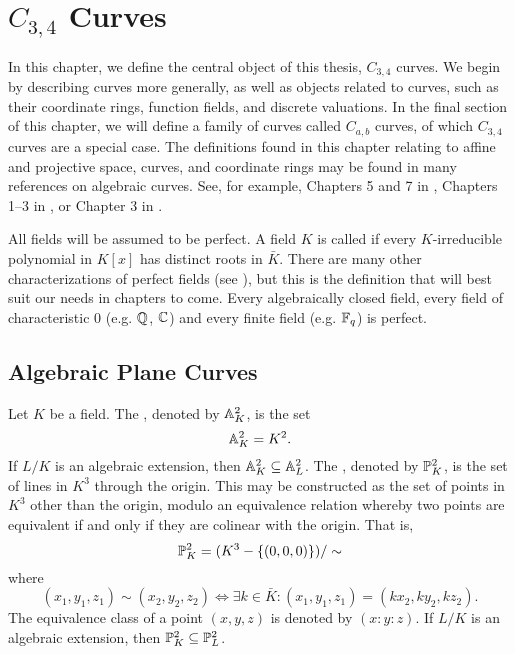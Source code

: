
\section{$C_{3,4}$ Curves}
\label{chap_curves}

In this chapter, we define the central object of this thesis, $C_{3,4}$ curves.
We begin by describing curves more generally, as well as objects related to curves,
such as their coordinate rings, function fields, and discrete valuations.
In the final section of this chapter, we will define a family of curves called $C_{a,b}$ curves,
of which $C_{3,4}$ curves are a special case.
The definitions found in this chapter
relating to affine and projective space, curves, and coordinate rings
may be found in many references on algebraic curves.
See, for example,
Chapters 5 and 7 in \cite{galbraith12},
Chapters 1--3 in \cite{kunz05},
or Chapter 3 in \cite{walker78}.

All fields will be assumed to be perfect.
A field $K$ is called  if every $K$-irreducible polynomial in $K[x]$
has distinct roots in $\bar K$.
There are many other characterizations of perfect fields (see \cite{hungerford}),
but this is the definition that will best suit our needs in chapters to come.
Every algebraically closed field,
every field of characteristic 0 (e.g. $\mathbb{Q}$, $\mathbb{C}$)
and every finite field (e.g. $\mathbb{F}_q$) is perfect.




\subsection{Algebraic Plane Curves}
\label{sec_plane_curves}

Let $K$ be a field.
The , denoted by $\mathbb{A}_K^2$, is the set
\[ \mathbb{A}_K^2 = K^2. \]
If $L/K$ is an algebraic extension, then $\mathbb{A}_K^2 \subseteq \mathbb{A}_L^2$.
The , denoted by $\mathbb{P}_K^2$, is the set of lines in $K^3$ through the origin.
This may be constructed as the set of points in $K^3$ other than the origin,
modulo an equivalence relation whereby two points are equivalent
if and only if they are colinear with the origin. That is,
\[ \mathbb{P}_K^2 = (K^3 - \{(0,0,0)\})/\sim \]
where
\begin{equation}
  \label{eq_projective_point_relation}
  (x_1, y_1, z_1) \sim (x_2, y_2, z_2) \iff \exists k \in \bar K : (x_1, y_1, z_1) = (kx_2, ky_2, kz_2).
\end{equation}
The equivalence class of a point $(x, y, z)$ is denoted by $(x : y : z)$.
If $L/K$ is an algebraic extension, then $\mathbb{P}_K^2 \subseteq \mathbb{P}_L^2$.

